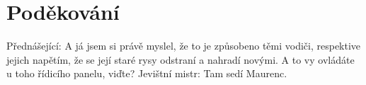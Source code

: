 \documentclass{cygclanek}
\begin{document}
\section*{Poděkování}
Přednášející: A já jsem si právě myslel, že to je způsobeno těmi vodiči, respektive jejich napětím, že se její staré rysy odstraní a nahradí novými. A to vy ovládáte u toho řídicího panelu, viďte? Jevištní mistr: Tam sedí Maurenc.
% 
% 
\end{document}

